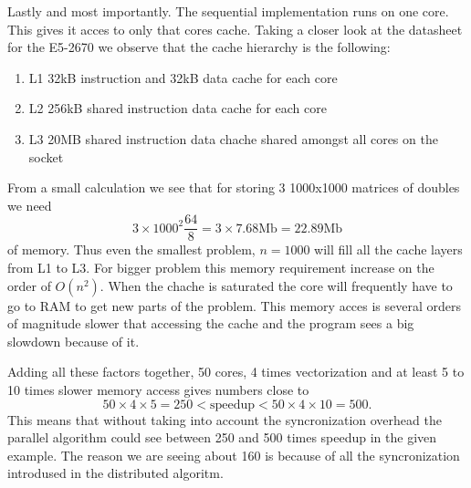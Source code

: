 \documentclass{article}
\begin{document}
Lastly and most importantly. The sequential implementation runs on one core. This
gives it acces to only that cores cache. Taking a closer look at the datasheet
for the E5-2670\cite{intel-datasheet} we observe that the cache hierarchy is
the following:
\begin{enumerate}
		\item L1 32kB instruction and 32kB data cache for each core
		\item L2 256kB shared instruction data cache for each core
		\item L3 20MB shared instruction data chache shared amongst all cores on the socket
\end{enumerate}
From a small calculation we see that for storing 3 1000x1000 matrices of doubles we need
\[
3 \times 1000^2 \frac{64}{8} = 3 \times 7.68 \text{Mb} = 22.89 \text{Mb}
\]
of memory.
Thus even the smallest problem, $n=1000$ will fill all the cache layers from L1 to L3.
For bigger problem this memory requirement increase on the order of $O(n^2)$.
When the chache is saturated the core will frequently have to go to RAM to get new parts of the problem. This memory
acces is several orders of magnitude slower that accessing the cache and the program sees a big
slowdown because of it.

Adding all these factors together, 50 cores, 4 times vectorization and at least 5 to 10 times slower memory access
gives numbers close to
\[
50 \times 4 \times 5 = 250 < \text{speedup} < 50 \times 4 \times 10 = 500.
\]
This means that without taking into account the syncronization overhead
the parallel algorithm could see between 250 and 500 times speedup in the given example.
The reason we are seeing about 160 is because
of all the syncronization introdused in the distributed algoritm.
\end{document}
